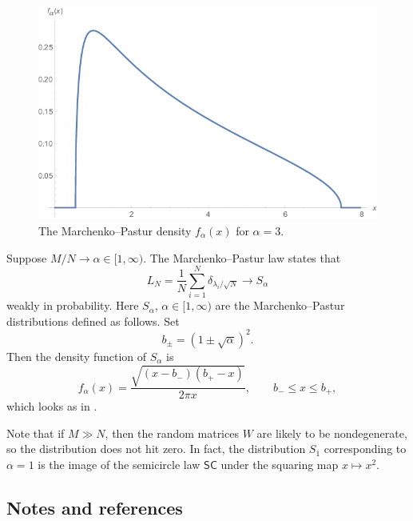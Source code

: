 \documentclass[letterpaper,11pt,oneside,reqno]{amsart}
\numberwithin{equation}{section}
\newcommand{\SC}{\mathsf{SC}}
\theoremstyle{definition}
\begin{document}
\begin{figure}[htbp]
	\includegraphics[width=.8\textwidth]{img/Marchenko-Pastur.png}
	\caption{The Marchenko--Pastur density $f_\alpha(x)$ for $\alpha=3$.}
	\label{fig:MP_law}
\end{figure}

Suppose $ M / N \to \alpha \in [ 1, \infty ) $. The Marchenko--Pastur law states that
\begin{equation*}
L_N = \frac{ 1 }{ N } \sum_{ i = 1 }^N \delta_{ \lambda_i / \sqrt{N} } \to S_\alpha 
\end{equation*}
weakly in probability. Here
$ S_\alpha $, $\alpha\in[1,\infty)$ are the Marchenko--Pastur distributions defined as follows.
Set
\begin{equation*}
b_\pm = ( 1 \pm \sqrt{\alpha} )^2.
\end{equation*}
Then the density function of $ S_\alpha $ is
\begin{equation*}
f_\alpha( x ) = \frac{ \sqrt{ ( x - b_- ) ( b_+ - x ) } }{ 2 \pi x }, \qquad b_- \le x \le b_+,
\end{equation*}
which looks as in .

Note that if $ M \gg N $, then the random matrices $W$ are likely to be nondegenerate, so the distribution does not hit zero.
In fact, the distribution $ S_1 $ corresponding to $\alpha=1$
is the image of the semicircle law $ \SC $ under the squaring map $ x \mapsto x^2 $.



\subsection{Notes and references} %
\label{sub:notes_WSCL}
\end{document}
